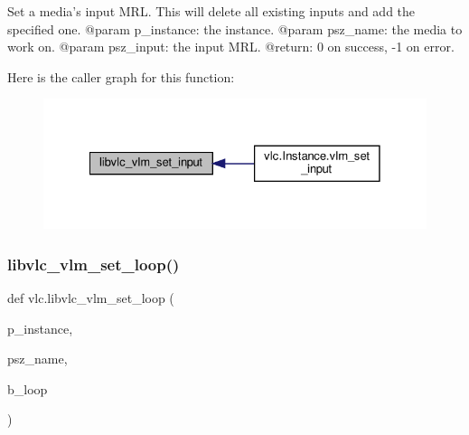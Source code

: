 \begin{DoxyVerb}Set a media's input MRL. This will delete all existing inputs and
add the specified one.
@param p_instance: the instance.
@param psz_name: the media to work on.
@param psz_input: the input MRL.
@return: 0 on success, -1 on error.
\end{DoxyVerb}
 Here is the caller graph for this function\+:
\nopagebreak
\begin{figure}[H]
\begin{center}
\leavevmode
\includegraphics[width=328pt]{namespacevlc_a21fb77c5d5ad58c7f98cebf8ee173ad9_icgraph}
\end{center}
\end{figure}
\mbox{\label{namespacevlc_a7084066e89dbf3c908a9674d892875a1}} 
\subsubsection{\texorpdfstring{libvlc\+\_\+vlm\+\_\+set\+\_\+loop()}{libvlc\_vlm\_set\_loop()}}
{\footnotesize\ttfamily def vlc.\+libvlc\+\_\+vlm\+\_\+set\+\_\+loop (\begin{DoxyParamCaption}\item[{}]{p\+\_\+instance,  }\item[{}]{psz\+\_\+name,  }\item[{}]{b\+\_\+loop }\end{DoxyParamCaption})}

